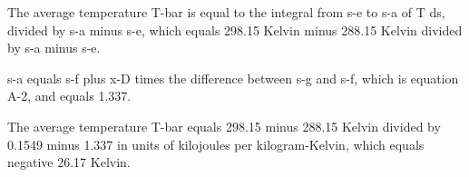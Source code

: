 The average temperature T-bar is equal to the integral from s-e to s-a of T ds, divided by s-a minus s-e, which equals 298.15 Kelvin minus 288.15 Kelvin divided by s-a minus s-e.

s-a equals s-f plus x-D times the difference between s-g and s-f, which is equation A-2, and equals 1.337.

The average temperature T-bar equals 298.15 minus 288.15 Kelvin divided by 0.1549 minus 1.337 in units of kilojoules per kilogram-Kelvin, which equals negative 26.17 Kelvin.